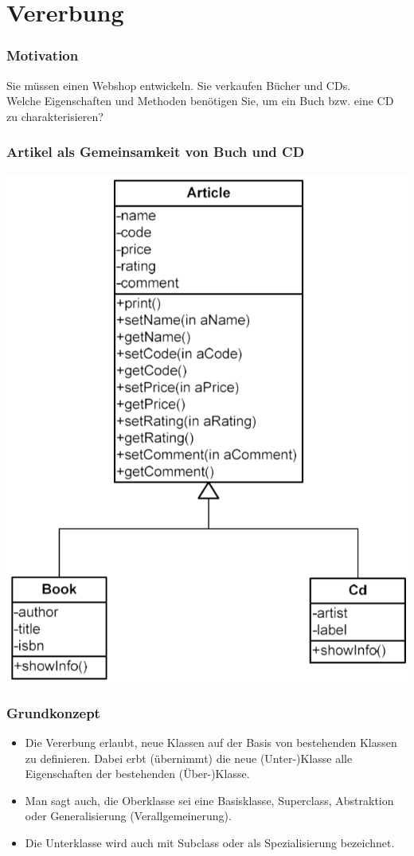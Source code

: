 
\part{Vererbung}
\label{sec:Vererbung}

\section{Motivation}
Sie müssen einen Webshop entwickeln. Sie verkaufen Bücher und CDs.\\
Welche Eigenschaften und Methoden benötigen Sie, um ein Buch bzw. eine CD zu charakterisieren?

\section{Artikel als Gemeinsamkeit von Buch und CD}
\includegraphics[width=0.3\linewidth]{images/vererbung1.png}

\section{Grundkonzept}
\begin{itemize}
	\item Die Vererbung erlaubt, neue Klassen auf der Basis von bestehenden Klassen zu definieren. Dabei erbt (übernimmt) die neue (Unter-)Klasse alle Eigenschaften der bestehenden (Über-)Klasse.
	\item Man sagt auch, die Oberklasse sei eine Basisklasse, Superclass, Abstraktion oder Generalisierung (Verallgemeinerung).
	\item Die Unterklasse wird auch mit Subclass oder als Spezialisierung bezeichnet.
\end{itemize}

